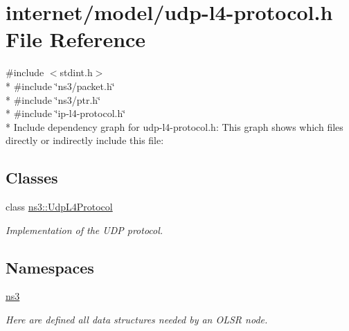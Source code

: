\hypertarget{udp-l4-protocol_8h}{}\section{internet/model/udp-\/l4-\/protocol.h File Reference}
\label{udp-l4-protocol_8h}
{\ttfamily \#include $<$stdint.\+h$>$}\\*
{\ttfamily \#include \char`\"{}ns3/packet.\+h\char`\"{}}\\*
{\ttfamily \#include \char`\"{}ns3/ptr.\+h\char`\"{}}\\*
{\ttfamily \#include \char`\"{}ip-\/l4-\/protocol.\+h\char`\"{}}\\*
Include dependency graph for udp-\/l4-\/protocol.h\+:
This graph shows which files directly or indirectly include this file\+:
\subsection*{Classes}
\begin{DoxyCompactItemize}
\item 
class \hyperlink{classns3_1_1UdpL4Protocol}{ns3\+::\+Udp\+L4\+Protocol}
\begin{DoxyCompactList}\small\item\em Implementation of the U\+DP protocol. \end{DoxyCompactList}\end{DoxyCompactItemize}
\subsection*{Namespaces}
\begin{DoxyCompactItemize}
\item 
 \hyperlink{namespacens3}{ns3}
\begin{DoxyCompactList}\small\item\em Here are defined all data structures needed by an O\+L\+SR node. \end{DoxyCompactList}\end{DoxyCompactItemize}
